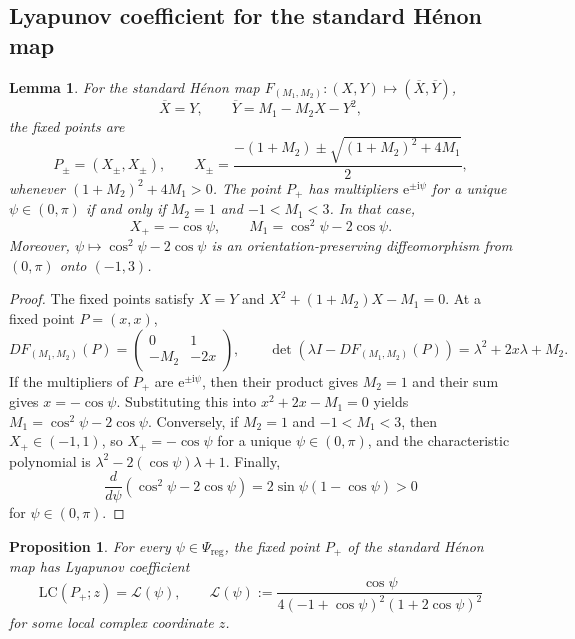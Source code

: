 \documentclass[11pt,a4paper]{article}
\theoremstyle{plain}
\newtheorem{proposition}[theorem]{Proposition}%
\newtheorem{lemma}[theorem]{Lemma}
\theoremstyle{definition}
\theoremstyle{plain}
\numberwithin{equation}{section}
\begin{document}
\subsection{Lyapunov coefficient for the standard H\'enon map}
\label{sec-LCHM}

\begin{lemma}\label{lem-Henon-elliptic}
For the standard H\'enon map $F_{(M_1,M_2)}: (X, Y) \longmapsto (\overline{X}, \overline{Y})$,
\begin{equation}
\label{eq-Hen}
\overline{X} = Y,
\qquad
\overline{Y} = M_1 - M_2 X - Y^2,
\end{equation}
the fixed points are
\[
P_\pm = (X_\pm,X_\pm),
\qquad
X_\pm = \frac{-(1+M_2) \pm \sqrt{(1+M_2)^2 + 4M_1}}{2},
\]
whenever $(1+M_2)^2 + 4M_1 > 0$. The point $P_+$ has multipliers $\mathrm{e}^{\pm \mathrm{i}\psi}$ for a unique $\psi \in (0,\pi)$ if and only if $M_2 = 1$ and $-1 < M_1 < 3$. In that case,
\[
X_+ = -\cos\psi,
\qquad
M_1 = \cos^2\psi - 2\cos\psi.
\]
Moreover, $\psi \longmapsto \cos^2\psi - 2\cos\psi$ is an orientation-preserving diffeomorphism from $(0,\pi)$ onto $(-1,3)$.
\end{lemma}

\begin{proof}
The fixed points satisfy $X = Y$ and $X^2 + (1+M_2)X - M_1 = 0$. At a fixed point $P = (x,x)$,
\[
DF_{(M_1,M_2)}(P)
=
\begin{pmatrix}
0 & 1 \\
-M_2 & -2x
\end{pmatrix},
\qquad
\det(\lambda I - DF_{(M_1,M_2)}(P))
=
\lambda^2 + 2x\lambda + M_2.
\]
If the multipliers of $P_+$ are $\mathrm{e}^{\pm \mathrm{i}\psi}$, then their product gives $M_2 = 1$ and their sum gives $x = -\cos\psi$. Substituting this into $x^2 + 2x - M_1 = 0$ yields $M_1 = \cos^2\psi - 2\cos\psi$. Conversely, if $M_2 = 1$ and $-1 < M_1 < 3$, then $X_+ \in (-1,1)$, so $X_+ = -\cos\psi$ for a unique $\psi \in (0,\pi)$, and the characteristic polynomial is $\lambda^2 - 2(\cos\psi)\lambda + 1$. Finally,
\[
\frac{d}{d\psi}(\cos^2\psi - 2\cos\psi)
=
2\sin\psi(1 - \cos\psi) > 0
\]
for $\psi \in (0,\pi)$.
\end{proof}

\begin{proposition}\label{prop-LC4Hen}
For every $\psi \in \Psi_\mathrm{reg}$, the fixed point $P_+$ of the standard H\'enon map has Lyapunov coefficient
\begin{equation}
\label{eq-LC4Hen}
\mathrm{LC}(P_+;z) = \mathcal{L}(\psi),
\qquad
\mathcal{L}(\psi)
:=
\frac{\cos\psi}{4(-1 + \cos\psi)^2(1 + 2\cos\psi)^2}
\end{equation}
for some local complex coordinate $z$.
\end{proposition}
\end{document}
